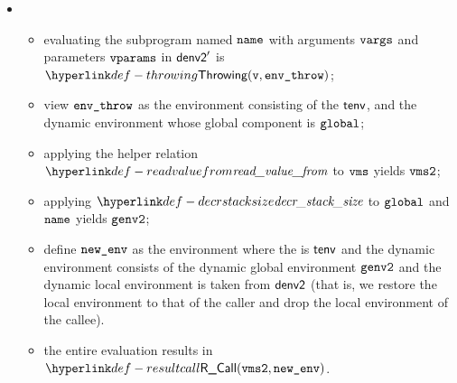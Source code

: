 \begin{itemize}
\begin{itemize}
    \item {}
    \begin{itemize}
      \item evaluating the subprogram named $\name$ with arguments $\vvargs$ and parameters $\vvparams$ in
            $\denvtwo'$ is $\Throwing(\vv, \envthrow)$\ProseOrDynErrorDiverging;
      \item view $\envthrow$ as the environment consisting of the \staticenvironmentterm{} $\tenv$,
            and the dynamic environment whose global component is $\vglobal$;
      \item applying the helper relation $\readvaluefrom$ to $\vms$ yields $\vmstwo$;
      \item applying $\decrstacksize$ to $\vglobal$ and $\name$ yields $\genvtwo$;
      \item define $\newenv$ as the environment where the \staticenvironmentterm{} is $\tenv$ and the dynamic environment consists
            of the dynamic global environment $\genvtwo$ and the dynamic local environment is taken from $\denvtwo$
            (that is, we restore the local environment to that of the caller and drop the local environment of the callee).
      \item the entire evaluation results in $\ResultCall(\vmstwo, \newenv)$.
    \end{itemize}
  \end{itemize}
\end{itemize}

\FormallyParagraph
\begin{mathpar}
\end{mathpar}

